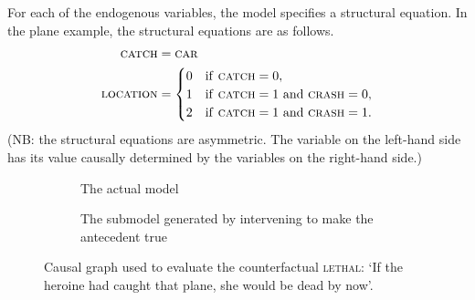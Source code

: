 For each of the endogenous variables, the model specifies a structural equation.  In the plane example, the structural equations are as follows.
$$
\begin{aligned}
\text{\textsc{catch}} &= \text{\textsc{car}}\\
\text{\textsc{location}} &= 
  \begin{cases}
	0 & \text{if \textsc{catch}} = 0,\\
	1 & \text{if \textsc{catch}} = 1 \text{ and \textsc{crash}} = 0,\\
	2 & \text{if \textsc{catch}} = 1 \text{ and \textsc{crash}} = 1.\\
  \end{cases}
\end{aligned}
$$
(NB: the structural equations are asymmetric.  The variable on the left-hand side has its value causally determined by the variables on the right-hand side.)

\begin{figure}
\begin{subfigure}{\textwidth}
\centering
{}
\caption{The actual model}
\label{fig-causal-graph}
\end{subfigure}

\begin{subfigure}{\textwidth}
\centering
{}
\caption{The submodel generated by intervening to make the antecedent true}
\label{fig-intervention}
\end{subfigure}

\caption{Causal graph used to evaluate the counterfactual \textsc{lethal}: `If the heroine had caught that plane, she would be dead by now'.}
\end{figure}

